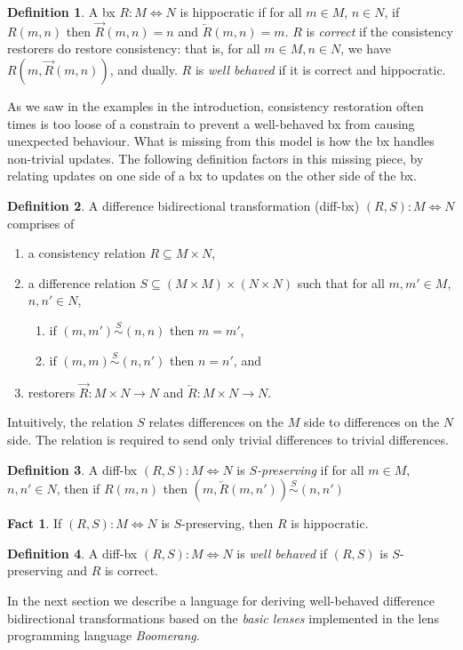 \documentclass[acmsmall,review,anonymous]{acmart}\settopmatter{printfolios=true,printccs=false,printacmref=false}
\theoremstyle{definition}
\newtheorem{definition}{Definition}
\newtheorem{fact}{Fact}
\begin{document}
\begin{definition}
A bx $R : M \Leftrightarrow N$ is hippocratic if for all $m \in M$, $n \in N$, if $R(m, n)$ then $\overrightarrow{R}(m, n) = n$ and $\overleftarrow{R}(m,n) = m$. $R$ is {\em correct} if the consistency restorers do restore consistency: that is, for all $m \in M, n \in N$, we have $R(m, \overrightarrow{R}(m, n))$, and dually. $R$ is {\em well behaved} if it is correct and hippocratic.
\end{definition}
As we saw in the examples in the introduction, consistency restoration often times is too loose of a constrain to prevent a well-behaved bx from causing unexpected behaviour. What is missing from this model is how the bx handles non-trivial updates. The following definition factors in this missing piece, by relating updates on one side of a bx to updates on the other side of the bx.
\begin{definition}
A difference bidirectional transformation (diff-bx) $(R,S) : M \Leftrightarrow N$ comprises of 
\begin{enumerate}
\item
a consistency relation $R \subseteq M \times N$,
\item
a difference relation $S \subseteq (M \times M) \times (N \times N)$ such that for all $m, m' \in M$, $n, n' \in N$,
\begin{enumerate}
\item
if $(m, m') \stackrel{S}{\sim} (n, n)$ then $m = m'$,
\item
if $(m, m) \stackrel{S}{\sim} (n, n')$ then $n = n'$, and
\end{enumerate}
\item
restorers $\overrightarrow{R} : M \times N \rightarrow N$ and $\overleftarrow{R} : M \times N \longrightarrow
N$.
\end{enumerate}
\end{definition}
Intuitively, the relation $S$ relates differences on the $M$ side to differences on the $N$ side. The relation is required to send only trivial differences to trivial differences.
\begin{definition}
A diff-bx $(R,S) : M \Leftrightarrow N$ is {\em $S$-preserving} if for all $m \in M$, $n, n' \in N$, then if $R(m, n)$ then $(m, \overleftarrow{R}(m,n')) \stackrel{S}{\sim} (n, n')$
\end{definition}
\begin{fact}
If $(R,S) : M \Leftrightarrow N$ is $S$-preserving, then $R$ is hippocratic.
\end{fact}
\begin{definition}
A diff-bx $(R,S) : M \Leftrightarrow N$ is {\em well behaved} if $(R,S)$ is $S$-preserving and $R$ is correct.
\end{definition}
In the next section we describe a language for deriving well-behaved difference bidirectional transformations based on the {\em basic lenses} implemented in the lens programming language {\em Boomerang}.
\end{document}
